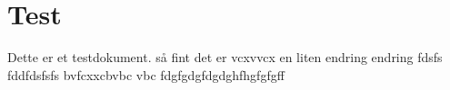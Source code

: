 \documentclass{article}
\begin{document}
\section{Test}
Dette er et testdokument. så fint det er vcxvvcx en liten endring  endring  fdsfs  fddfdsfsfs  bvfcxxcbvbc vbc fdgfgdgfdgdghfhgfgfgff

\lipsum[1-2]
\end{document}
